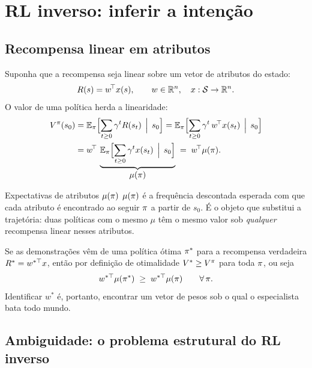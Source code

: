 \documentclass[11pt]{article}
\newcommand{\feat}{x}
\newcommand{\mufeat}{\mu}
\newcommand{\polE}{\pol^{*}}
\newcommand{\wv}{w}
\begin{document}
\section{RL inverso: inferir a intenção}

\subsection{Recompensa linear em atributos}

Suponha que a recompensa seja linear sobre um vetor de atributos do estado:
\[
  \rec(s) = \wv^{\!\top}\feat(s), \qquad \wv\in\R^n,\quad \feat:\gS\to\R^n .
\]
O valor de uma política herda a linearidade:
\begin{align*}
  V^{\pol}(s_0) &= \E_{\pol}\Bigl[\sum_{t\ge0}\gamma^t \rec(s_t)\,\Bigm|\, s_0\Bigr]
   = \E_{\pol}\Bigl[\sum_{t\ge0}\gamma^t\,\wv^{\!\top}\feat(s_t)\,\Bigm|\, s_0\Bigr]\\
   &= \wv^{\!\top}\,\underbrace{\E_{\pol}\Bigl[\sum_{t\ge0}\gamma^t \feat(s_t)\,\Bigm|\, s_0\Bigr]}_{\textstyle \mufeat(\pol)}
   \;=\; \wv^{\!\top}\mufeat(\pol).
\end{align*}

\begin{defbox}{Expectativas de atributos $\mufeat(\pol)$}
  $\mufeat(\pol)$ é a frequência descontada esperada com que cada atributo é encontrado
  ao seguir $\pi$ a partir de $s_0$. É o objeto que substitui a trajetória: duas
  políticas com o mesmo $\mufeat$ têm o mesmo valor sob \emph{qualquer} recompensa linear
  nesses atributos.
\end{defbox}

Se as demonstrações vêm de uma política ótima $\polE$ para a recompensa verdadeira
$\rec^* = \wv^{*\top}\feat$, então por definição de otimalidade
$V^{*} \ge V^{\pi}$ para toda $\pi$, ou seja
\[
  \wv^{*\top}\mufeat(\polE) \;\ge\; \wv^{*\top}\mufeat(\pol)
  \qquad \forall\,\pol .
\]
Identificar $\wv^*$ é, portanto, encontrar um vetor de pesos sob o qual o especialista
bata todo mundo.

\subsection{Ambiguidade: o problema estrutural do RL inverso}
\end{document}
